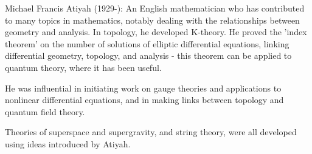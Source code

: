 Michael Francis Atiyah (1929-): An English mathematician who has contributed to
many topics in mathematics, notably dealing with the relationships 
between geometry and analysis. In topology, he developed K-theory. He
proved the 'index theorem' on the number of solutions of elliptic differential
equations, linking differential geometry, topology, and analysis - this theorem
can be applied to quantum theory, where it has been useful.
 \par
 He was influential in initiating work on gauge theories and applications
to nonlinear differential equations, and in making links between topology and 
quantum field theory.
\par
  Theories of superspace and supergravity, and string 
theory, were all developed using ideas introduced by Atiyah.